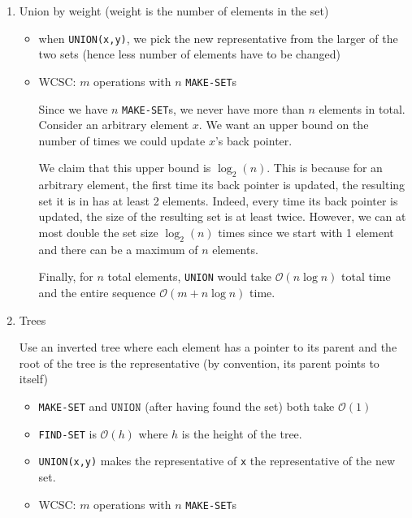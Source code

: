 \documentclass[11pt]{article}
\begin{document}
\begin{enumerate}
    \item Union by weight (weight is the number of elements in the set) 
    
    \begin{itemize}
        \item when \texttt{UNION(x,y)}, we pick the new representative from the larger of the two sets (hence less number of elements have to be changed) 
        
        \item WCSC: $m$ operations with $n$ \texttt{MAKE-SET}s
        
        Since we have $n$ \texttt{MAKE-SET}s, we never have more than $n$ elements in total. Consider an arbitrary element $x$. We want an upper bound on the number of times we could update $x$'s back pointer. 
        
        We claim that this upper bound is $\log_2(n)$. This is because for an arbitrary element, the first time its back pointer is updated, the resulting set it is in has at least 2 elements. Indeed, every time its back pointer is updated, the size of the resulting set is at least twice. However, we can at most double the set size $\log_2(n)$ times since we start with 1 element and there can be a maximum of $n$ elements. 
        
        Finally, for $n$ total elements, \texttt{UNION} would take $\mathcal{O}(n \log n)$ total time and the entire sequence $\mathcal{O}(m + n \log n)$ time. 
    \end{itemize}
    
    \item Trees
    
    Use an inverted tree where each element has a pointer to its parent and the root of the tree is the representative (by convention, its parent points to itself) 
    \begin{itemize}
        \item \texttt{MAKE-SET} and $\texttt{UNION}$ (after having found the set) both take $\mathcal{O}(1)$
        \item \texttt{FIND-SET} is $\mathcal{O}(h)$ where $h$ is the height of the tree. 
        
        \item \texttt{UNION(x,y)} makes the representative of \texttt{x} the representative of the new set. 
        
        \item WCSC: $m$ operations with $n$ \texttt{MAKE-SET}s
        

\end{itemize}
\end{enumerate}
\end{document}
